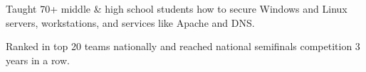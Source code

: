 \begin{cventries}
{\begin{cvitems}
        \item {Taught 70+ middle \& high school students how to secure Windows and Linux servers, workstations, and services like Apache and DNS.}
        \item {Ranked in top 20 teams nationally and reached national semifinals competition 3 years in a row.}
      \end{cvitems}
    }
\end{cventries}
